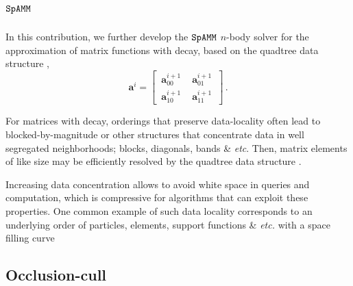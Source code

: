 \documentclass[letterpaper,twocolumn,amsmath,amsfont,amssymb,english,aps,jcp,preprintnumbers,groupaddress,nofootinbib,tightenlines,floatfix]{revtex4}
\newcommand{\mat}[1]{\boldsymbol{#1}}
\theoremstyle{plain}
\theoremstyle{remark}
\theoremstyle{plain}
\begin{document}
\tableofcontents

\section{$\tt SpAMM$}

In this contribution, we further develop the $\tt SpAMM$ $n$-body solver for the
approximation of matrix functions with decay, based on the quadtree data structure 
\cite{Wise:1984:RMQ:1089389.1089398,springerlink:10.1007/3-540-51084-2_9,
      Samet:1990:DAS:77589,Wise1990,Wise:Ahnentafel,
      Lorton:2006:ABL:1166133.1166134,Samet:2006:DBDS,Adams:2006:SOS,bader13},
\begin{equation}
\mat{a}^i = \begin{bmatrix} \,  \mat{a}^{i+1}_{00} \, & \,  \mat{a}^{i+1}_{01} \,  
\\[0.2cm]  \, \mat{a}^{i+1}_{10} \,  & \,\mat{a}^{i+1}_{11} \, \end{bmatrix} \, .
\end{equation}

For matrices with decay, orderings that preserve data-locality often 
lead to blocked-by-magnitude or other structures that concentrate data in 
well segregated neighborhoods; blocks, diagonals, bands \& {\em etc}.   
Then, matrix elements of like size may be efficiently resolved by the quadtree data structure 
\cite{Wise:1984:RMQ:1089389.1089398,springerlink:10.1007/3-540-51084-2_9,
      Samet:1990:DAS:77589,Wise1990,Wise:Ahnentafel,
      Lorton:2006:ABL:1166133.1166134,Samet:2006:DBDS,Adams:2006:SOS,Bock2013,bader13}.

Increasing data concentration allows to avoid white space in queries and 
computation, which is compressive for algorithms that can exploit these properties.
One common example of such data locality corresponds to an underlying order
of particles, elements, support functions \& {\em etc.} with a space filling curve 
\cite{Aluru:1997:SFC,Bader:2006:SFC,Campbell:2003:SFC,Devine:2005:SFC,Lashuk:2009:SFC, 
Gunther2006,Camata2010,1298805,Bock2013,bader13}

\subsection{Occlusion-cull }
\end{document}
